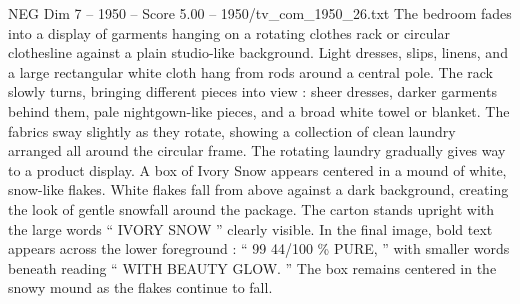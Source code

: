 \begin{textsample}{NEG Dim 7 – 1950 – Score 5.00 – 1950/tv\_com\_1950\_26.txt}
The bedroom fades into a display of garments hanging on a rotating clothes rack or circular clothesline against a plain studio-like background.
Light dresses, slips, linens, and a large rectangular white cloth hang from rods around a central pole.
The rack slowly turns, bringing different pieces into view : sheer dresses, darker garments behind them, pale nightgown-like pieces, and a broad white towel or blanket.
The fabrics sway slightly as they rotate, showing a collection of clean laundry arranged all around the circular frame.
The rotating laundry gradually gives way to a product display.
A box of Ivory Snow appears centered in a mound of white, snow-like flakes.
White flakes fall from above against a dark background, creating the look of gentle snowfall around the package.
The carton stands upright with the large words “ IVORY SNOW ” clearly visible.
In the final image, bold text appears across the lower foreground : “ 99 44/100 \% PURE, ” with smaller words beneath reading “ WITH BEAUTY GLOW. ” The box remains centered in the snowy mound as the flakes continue to fall.

\end{textsample}
